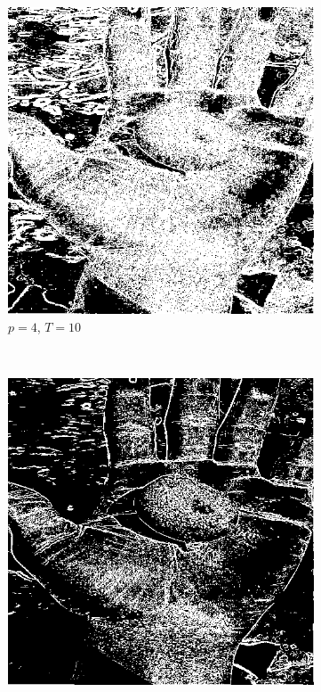 \documentclass{article}
\begin{document}
\begin{enumerate}[label=(\alph*)]
\begin{figure}
        \begin{subfigure}[b]{0.3\textwidth}
            \includegraphics[width=\textwidth]{img/ED1_4_10.png}
            \caption{$p = 4$, $T = 10$}
        \end{subfigure}
        ~
        \begin{subfigure}[b]{0.3\textwidth}
            \includegraphics[width=\textwidth]{img/ED1_4_30.png}

\end{subfigure}
\end{figure}
\end{enumerate}
\end{document}
